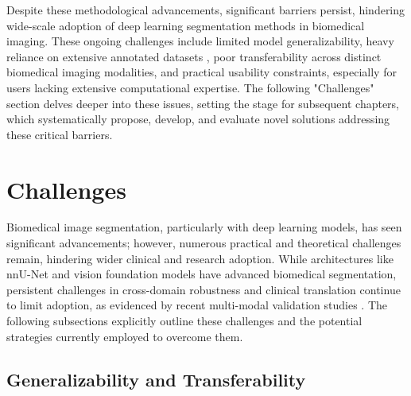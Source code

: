 \documentclass[./dissertation.tex]{subfiles}
\begin{document}


Despite these methodological advancements, significant barriers persist, hindering wide-scale adoption of deep learning segmentation methods in biomedical imaging. These ongoing challenges include limited model generalizability, heavy reliance on extensive annotated datasets \cite{wang2021annotation}, poor transferability across distinct biomedical imaging modalities, and practical usability constraints, especially for users lacking extensive computational expertise. The following "Challenges" section delves deeper into these issues, setting the stage for subsequent chapters, which systematically propose, develop, and evaluate novel solutions addressing these critical barriers.

\section{Challenges}
\textcolor{BulldogRed}{Biomedical image segmentation, particularly with deep learning models, has seen significant advancements; however, numerous practical and theoretical challenges remain, hindering wider clinical and research adoption. While architectures like nnU-Net and vision foundation models have advanced biomedical segmentation, persistent challenges in cross-domain robustness and clinical translation continue to limit adoption, as evidenced by recent multi-modal validation studies \cite{isensee2024nnu}. The following subsections explicitly outline these challenges and the potential strategies currently employed to overcome them.}

\textcolor{BulldogRed}{\subsection{Generalizability and Transferability}}
\end{document}
